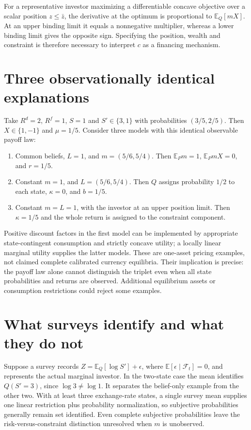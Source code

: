 \documentclass[11pt]{article}
\begin{document}
For a representative investor maximizing a differentiable concave objective over a scalar position $z\leq\bar z$, the derivative at the optimum is proportional to $\mathbb E_Q[mX]$. At an upper binding limit it equals a nonnegative multiplier, whereas a lower binding limit gives the opposite sign. Specifying the position, wealth and constraint is therefore necessary to interpret $c$ as a financing mechanism.

\section{Three observationally identical explanations}
Take $R^d=2$, $R^f=1$, $S=1$ and $S'\in\{3,1\}$ with probabilities $(3/5,2/5)$. Then $X\in\{1,-1\}$ and $\mu=1/5$. Consider three models with this identical observable payoff law:
\begin{enumerate}
\item Common beliefs, $L=1$, and $m=(5/6,5/4)$. Then $\mathbb E_Pm=1$, $\mathbb E_PmX=0$, and $r=1/5$.
\item Constant $m=1$, and $L=(5/6,5/4)$. Then $Q$ assigns probability $1/2$ to each state, $\kappa=0$, and $b=1/5$.
\item Constant $m=L=1$, with the investor at an upper position limit. Then $\kappa=1/5$ and the whole return is assigned to the constraint component.
\end{enumerate}
Positive discount factors in the first model can be implemented by appropriate state-contingent consumption and strictly concave utility; a locally linear marginal utility supplies the latter models. These are one-asset pricing examples, not claimed complete calibrated currency equilibria. Their implication is precise: the payoff law alone cannot distinguish the triplet even when all state probabilities and returns are observed. Additional equilibrium assets or consumption restrictions could reject some examples.

\section{What surveys identify and what they do not}
Suppose a survey records $Z=\mathbb E_Q[\log S']+\epsilon$, where $\mathbb E[\epsilon\mid\mathcal F_t]=0$, and represents the actual marginal investor. In the two-state case the mean identifies $Q(S'=3)$, since $\log3\neq\log1$. It separates the belief-only example from the other two. With at least three exchange-rate states, a single survey mean supplies one linear restriction plus probability normalization, so subjective probabilities generally remain set identified. Even complete subjective probabilities leave the risk-versus-constraint distinction unresolved when $m$ is unobserved.
\end{document}
